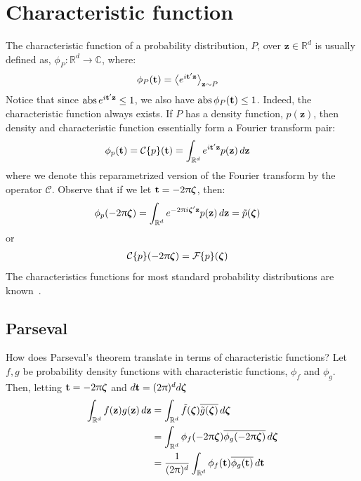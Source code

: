 \documentclass[a4paper,oneside,12pt,english]{report}
\def\zvec{\mathbf{z}}
\DeclareMathOperator{\abs}{abs}
\def\expv#1#2{\bigl\langle#1\bigr\rangle_{#2}}
\def\R{\mathbb{R}}
\def\funcdef#1#2#3{#1:#2\to#3}
\def\Fset{\mathcal{F}}
\def\C{\mathbb{C}}
\def\Cset{\mathcal{C}}
\newcommand\FT[2][]{\Fset_{#1}\{#2\}}
\newcommand\CT[2][]{\Cset_{#1}\{#2\}}
\def\conj#1{\overline{#1}}
\begin{document}
\section{Characteristic function}
The characteristic function of a probability distribution, $P$, over $\zvec\in\R^d$ is usually defined as, $\funcdef{\phi_P}{\R^d}{\C}$, where:
\begin{align}
\phi_P(\tvec) &= \expv{e^{i\tvec'\zvec}}{\zvec\sim P}
\end{align}
Notice that since $\abs{e^{i\tvec'\zvec}}\le1$, we also have $\abs{\phi_P(\tvec)}\le1$. Indeed, the characteristic function always exists. If $P$ has a density function, $p(\zvec)$, then density and characteristic function essentially form a Fourier transform pair:
\begin{align}
\phi_p(\tvec) &= \CT{p}(\tvec) = \int_{\R^d} e^{i\tvec'\zvec} p(\zvec)\,d\zvec
\end{align}
where we denote this reparametrized version of the Fourier transform by the operator $\Cset$. Observe that if we let $\mathbf{t}=-2\uppi\boldsymbol{\zeta}$, then: 
\begin{align}
 \phi_p(-2\uppi\zetavec) &= \int_{\R^d} e^{-2\uppi i\zetavec'\zvec} p(\zvec)\,d\zvec = \tilde p(\zetavec)
\end{align}
or
\begin{align}
 \CT{p}(-2\uppi\zetavec) &= \FT{p}(\zetavec)
\end{align}
The characteristics functions for most standard probability distributions are known~\cite{Oberhettinger}. 

\subsection{Parseval}
\label{sec:cfParseval}
How does Parseval's theorem translate in terms of characteristic functions? Let $f,g$ be probability density functions with characteristic functions, $\phi_f$ and $\phi_g$. Then, letting $\mathbf{t}=-2\uppi\boldsymbol{\zeta}$ and $d\mathbf{t}=(2\uppi)^d d\boldsymbol{\zeta}$
\begin{align}
\begin{split}
\int_{\R^d} f(\zvec)g(\zvec)\,d\zvec &= \int_{\R^d} \tilde f(\zetavec)\conj{\tilde g(\zetavec)}\,d\zetavec \\
&= \int_{\R^d} \phi_f(-2\uppi\zetavec)\conj{\phi_g(-2\uppi\zetavec)}\,d\zetavec\\
&= \frac1{(2\uppi)^d}\int_{\R^d} \phi_f(\tvec)\conj{\phi_g(\tvec)}\,d\tvec\\
\end{split}
\end{align}
\end{document}
